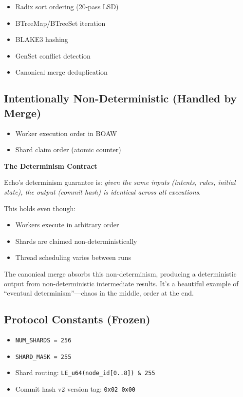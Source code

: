 \documentclass[11pt]{book}
\providecommand{\tightlist}{%
  \setlength{\itemsep}{0pt}\setlength{\parskip}{0pt}}
\begin{document}
\begin{itemize}
\tightlist
\item
  Radix sort ordering (20-pass LSD)
\item
  BTreeMap/BTreeSet iteration
\item
  BLAKE3 hashing
\item
  GenSet conflict detection
\item
  Canonical merge deduplication
\end{itemize}

\subsection{Intentionally Non-Deterministic (Handled by
Merge)}\label{intentionally-non-deterministic-handled-by-merge}

\begin{itemize}
\tightlist
\item
  Worker execution order in BOAW
\item
  Shard claim order (atomic counter)
\end{itemize}

\begin{deepdive}
\textbf{The Determinism Contract}

Echo's determinism guarantee is: \emph{given the same inputs (intents, rules, initial state), the output (commit hash) is identical across all executions}.

This holds even though:
\begin{itemize}
\item Workers execute in arbitrary order
\item Shards are claimed non-deterministically
\item Thread scheduling varies between runs
\end{itemize}

The canonical merge absorbs this non-determinism, producing a deterministic output from non-deterministic intermediate results. It's a beautiful example of ``eventual determinism''---chaos in the middle, order at the end.
\end{deepdive}

\subsection{Protocol Constants
(Frozen)}\label{protocol-constants-frozen}

\begin{itemize}
\tightlist
\item
  \texttt{NUM\_SHARDS\ =\ 256}
\item
  \texttt{SHARD\_MASK\ =\ 255}
\item
  Shard routing: \texttt{LE\_u64(node\_id{[}0..8{]})\ \&\ 255}
\item
  Commit hash v2 version tag: \texttt{0x02\ 0x00}
\end{itemize}
\end{document}
